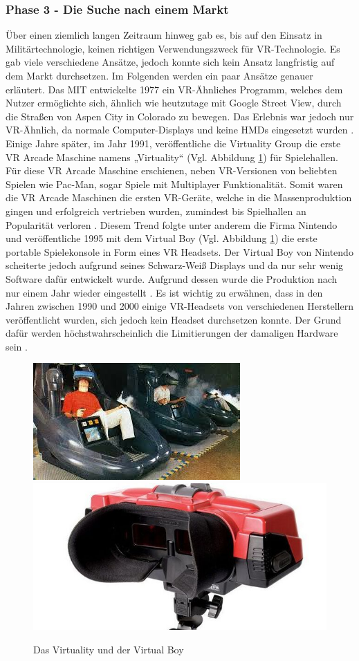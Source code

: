\subsubsection{Phase 3 - Die Suche nach einem Markt}
Über einen ziemlich langen Zeitraum hinweg gab es, bis auf den Einsatz in Militärtechnologie, keinen richtigen Verwendungszweck für VR-Technologie. Es gab viele verschiedene Ansätze, jedoch konnte sich kein Ansatz langfristig auf dem Markt durchsetzen. Im Folgenden werden ein paar Ansätze genauer erläutert.
\newline\newline
Das MIT entwickelte 1977 ein VR-Ähnliches Programm, welches dem Nutzer ermöglichte sich, ähnlich wie heutzutage mit Google Street View, durch die Straßen von Aspen City in Colorado zu bewegen. Das Erlebnis war jedoch nur VR-Ähnlich, da normale Computer-Displays und keine HMDs eingesetzt wurden \cite{20}.
Einige Jahre später, im Jahr 1991, veröffentliche die Virtuality Group die erste VR Arcade Maschine namens „Virtuality“ (Vgl. Abbildung \ref{fig:VirtualityVRBoy}) für Spielehallen. Für diese VR Arcade Maschine erschienen, neben VR-Versionen von beliebten Spielen wie Pac-Man, sogar Spiele mit Multiplayer Funktionalität. Somit waren die VR Arcade Maschinen die ersten VR-Geräte, welche in die Massenproduktion gingen und erfolgreich vertrieben wurden, zumindest bis Spielhallen an Popularität verloren \cite{20}.
\newline
Diesem Trend folgte unter anderem die Firma Nintendo und veröffentliche 1995 mit dem Virtual Boy (Vgl. Abbildung \ref{fig:VirtualityVRBoy}) die erste portable Spielekonsole in Form eines VR Headsets. Der Virtual Boy von Nintendo scheiterte jedoch aufgrund seines Schwarz-Weiß Displays und da nur sehr wenig Software dafür entwickelt wurde. Aufgrund dessen wurde die Produktion nach nur einem Jahr wieder eingestellt \cite{20}. Es ist wichtig zu erwähnen, dass in den Jahren zwischen 1990 und 2000 einige VR-Headsets von verschiedenen Herstellern veröffentlicht wurden, sich jedoch kein Headset durchsetzen konnte. Der Grund dafür werden höchstwahrscheinlich die Limitierungen der damaligen Hardware sein \cite{10}.
\begin{figure}[h]
	\centering
	\includegraphics[width=0.4\linewidth]{Bilder/A17_Virtuality}
	\includegraphics[width=0.4\linewidth]{Bilder/A18_VIrtualBoy}
	\caption{Das Virtuality und der Virtual Boy \cite{20, A18}}
	\label{fig:VirtualityVRBoy}
\end{figure}

